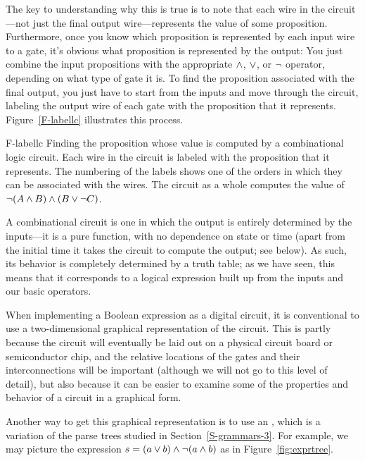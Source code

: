 The key to understanding why this is true
is to note that each wire in the circuit---not just the final
output wire---represents the value of some proposition.  
Furthermore, once you know which proposition is represented by
each input wire to a gate, it's obvious what proposition is
represented by the output: You just combine the input propositions
with the appropriate $\wedge$, $\vee$, or $\lnot$ operator, depending
on what type of gate it is.   To find
the proposition associated with the final output, you just have to
start from the inputs and move through the circuit, labeling the
output wire of each gate with the proposition that it represents.
Figure~\ref{F-labellc} illustrates this process.

\fig
    {F-labellc}
    {Finding the proposition whose value is computed by a
     combinational logic circuit.  Each wire in the circuit is
     labeled with the proposition that it represents.  The
     numbering of the labels shows one of the orders in which they 
     can be associated with the wires.  The circuit as a whole
     computes the value of $\lnot(A\wedge B)\wedge(B\vee\lnot C)$.}
    {}

\medbreak

A combinational circuit is one in which the output is entirely determined by the inputs---it is a pure function, with no dependence on state or time (apart from the initial time it takes the circuit to compute the output; see below). As such, its behavior is completely determined by a truth table; as we have seen, this means that it corresponds to a logical expression built up from the inputs and our basic operators.

When implementing a Boolean expression as a digital circuit, it is conventional to use a two-dimensional graphical representation of the circuit. This is partly because the circuit will eventually be laid out on a physical circuit board or semiconductor chip, and the relative locations of the gates and their interconnections will be important (although we will not go to this level of detail), but also because it can be easier to examine some of the properties and behavior of a circuit in a graphical form.

Another way to get this graphical representation is to use an , which is a variation of the parse trees studied in Section~\ref{S-grammars-3}. For example, we may picture the expression $s=(a\vee b)\wedge\lnot(a\wedge b)$ as in Figure~\ref{fig:exprtree}.

